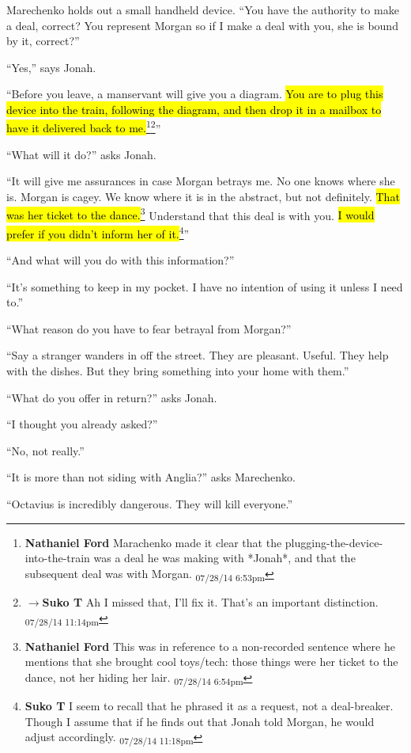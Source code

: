 Marechenko holds out a small handheld device.  ``You have the authority to make a deal, correct?  You represent Morgan so if I make a deal with you, she is bound by it, correct?''

``Yes,'' says Jonah.

``Before you leave, a manservant will give you a diagram.  \hl{You are to plug this device into the train, following the diagram, and then drop it in a mailbox to have it delivered back to me.}\footnote{\textbf{Nathaniel Ford }Marachenko made it clear that the plugging-the-device-into-the-train was a deal he was making with *Jonah*, and that the subsequent deal was with Morgan. \textsubscript{07/28/14 6:53pm}}\footnote{$\rightarrow$\textbf{Suko T }Ah I missed that, I'll fix it.  That's an important distinction. \textsubscript{07/28/14 11:14pm}}''

``What will it do?'' asks Jonah.

``It will give me assurances in case Morgan betrays me.  No one knows where she is.  Morgan is cagey.  We know where it is in the abstract, but not definitely.  \hl{That was her ticket to the dance.}\footnote{\textbf{Nathaniel Ford }This was in reference to a non-recorded sentence where he mentions that she brought cool toys/tech: those things were her ticket to the dance, not her hiding her lair. \textsubscript{07/28/14 6:54pm}}  Understand that this deal is with you.  \hl{I would prefer if you didn't inform her of it.}\footnote{\textbf{Suko T }I seem to recall that he phrased it as a request, not a deal-breaker.  Though I assume that if he finds out that Jonah told Morgan, he would adjust accordingly. \textsubscript{07/28/14 11:18pm}}''

``And what will you do with this information?''

``It's something to keep in my pocket.  I have no intention of using it unless I need to.''

``What reason do you have to fear betrayal from Morgan?''

``Say a stranger wanders in off the street.  They are pleasant.  Useful.  They help with the dishes. But they bring something into your home with them.''

``What do you offer in return?'' asks Jonah.

``I thought you already asked?''

``No, not really.''

``It is more than not siding with Anglia?'' asks Marechenko.

``Octavius is incredibly dangerous.  They will kill everyone.''

